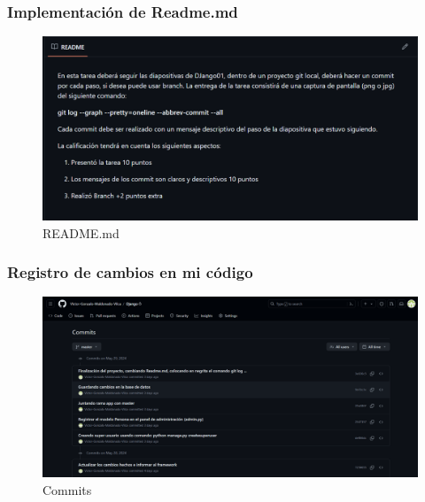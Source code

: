 \documentclass{article}
\begin{document}
  
  \subsubsection{Implementación de Readme.md}
  \begin{figure}[H]
    \centering
    \includegraphics[width=1\textwidth, keepaspectratio]{img/readme.png}
    \caption{README.md}
  \end{figure}
  

	\subsubsection{Registro de cambios en mi código}
  \begin{figure}[H]
    \centering
    \includegraphics[width=1\textwidth, keepaspectratio]{img/commits.png}
    \caption{Commits}
  \end{figure}
  \newpage
	
\end{document}

